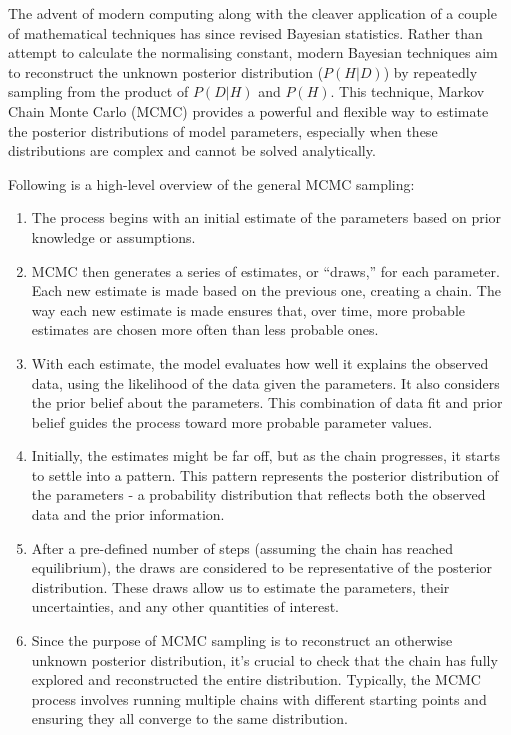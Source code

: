 \documentclass[
  8pt,
  a4paper]{article}
\begin{document}
\begin{tcolorbox}
The advent of modern computing along with the cleaver application of a
couple of mathematical techniques has since revised Bayesian statistics.
Rather than attempt to calculate the normalising constant, modern
Bayesian techniques aim to reconstruct the unknown posterior
distribution (\(P(H|D)\)) by repeatedly sampling from the product of
\(P(D|H)\) and \(P(H)\). This technique, Markov Chain Monte Carlo (MCMC)
provides a powerful and flexible way to estimate the posterior
distributions of model parameters, especially when these distributions
are complex and cannot be solved analytically.

Following is a high-level overview of the general MCMC sampling:

\begin{enumerate}
\def\labelenumi{\arabic{enumi}.}
\item
  The process begins with an initial estimate of the parameters based on
  prior knowledge or assumptions.
\item
  MCMC then generates a series of estimates, or ``draws,'' for each
  parameter. Each new estimate is made based on the previous one,
  creating a chain. The way each new estimate is made ensures that, over
  time, more probable estimates are chosen more often than less probable
  ones.
\item
  With each estimate, the model evaluates how well it explains the
  observed data, using the likelihood of the data given the parameters.
  It also considers the prior belief about the parameters. This
  combination of data fit and prior belief guides the process toward
  more probable parameter values.
\item
  Initially, the estimates might be far off, but as the chain
  progresses, it starts to settle into a pattern. This pattern
  represents the posterior distribution of the parameters - a
  probability distribution that reflects both the observed data and the
  prior information.
\item
  After a pre-defined number of steps (assuming the chain has reached
  equilibrium), the draws are considered to be representative of the
  posterior distribution. These draws allow us to estimate the
  parameters, their uncertainties, and any other quantities of interest.
\item
  Since the purpose of MCMC sampling is to reconstruct an otherwise
  unknown posterior distribution, it's crucial to check that the chain
  has fully explored and reconstructed the entire distribution.
  Typically, the MCMC process involves running multiple chains with
  different starting points and ensuring they all converge to the same
  distribution.
\end{enumerate}

\end{tcolorbox}
\end{document}
